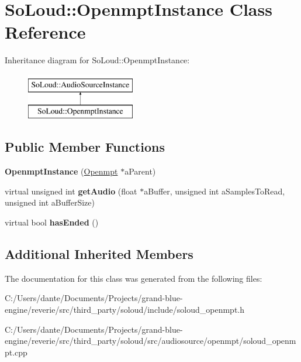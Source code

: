 \hypertarget{class_so_loud_1_1_openmpt_instance}{}\section{So\+Loud\+::Openmpt\+Instance Class Reference}
\label{class_so_loud_1_1_openmpt_instance}
Inheritance diagram for So\+Loud\+::Openmpt\+Instance\+:\begin{figure}[H]
\begin{center}
\leavevmode
\includegraphics[height=2.000000cm]{class_so_loud_1_1_openmpt_instance}
\end{center}
\end{figure}
\subsection*{Public Member Functions}
\begin{DoxyCompactItemize}
\item 
\mbox{\label{class_so_loud_1_1_openmpt_instance_a548e85db17c9598c0f5b7ddb3f44ec38}} 
{\bfseries Openmpt\+Instance} (\mbox{\hyperlink{class_so_loud_1_1_openmpt}{Openmpt}} $\ast$a\+Parent)
\item 
\mbox{\label{class_so_loud_1_1_openmpt_instance_a247a18688c123a4f238ad33b0fa298ee}} 
virtual unsigned int {\bfseries get\+Audio} (float $\ast$a\+Buffer, unsigned int a\+Samples\+To\+Read, unsigned int a\+Buffer\+Size)
\item 
\mbox{\label{class_so_loud_1_1_openmpt_instance_a7f55a69c503c313ab21c7dc651f194bf}} 
virtual bool {\bfseries has\+Ended} ()
\end{DoxyCompactItemize}
\subsection*{Additional Inherited Members}


The documentation for this class was generated from the following files\+:\begin{DoxyCompactItemize}
\item 
C\+:/\+Users/dante/\+Documents/\+Projects/grand-\/blue-\/engine/reverie/src/third\+\_\+party/soloud/include/soloud\+\_\+openmpt.\+h\item 
C\+:/\+Users/dante/\+Documents/\+Projects/grand-\/blue-\/engine/reverie/src/third\+\_\+party/soloud/src/audiosource/openmpt/soloud\+\_\+openmpt.\+cpp\end{DoxyCompactItemize}
